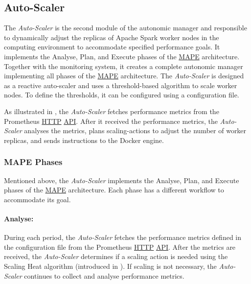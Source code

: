 \subsection{Auto-Scaler}
The \textit{Auto-Scaler} is the second module of the autonomic manager and responsible to dynamically adjust the replicas of Apache Spark worker nodes in the computing environment to accommodate specified performance goals. 
It implements the Analyse, Plan, and Execute phases of the \hyperlink{abbr:mape}{MAPE} architecture. Together with the monitoring system, it creates a complete autonomic manager implementing all phases of the \hyperlink{abbr:mape}{MAPE} architecture.
The \textit{Auto-Scaler} is designed as a reactive auto-scaler and uses a threshold-based algorithm to scale worker nodes. To define the thresholds, it can be configured using a configuration file.


As illustrated in , the \textit{Auto-Scaler} fetches performance metrics from the Prometheus \hyperlink{abbr:http}{HTTP} \hyperlink{abbr:api}{API}.
After it received the performance metrics, the \textit{Auto-Scaler} analyses the metrics, plans scaling-actions to adjust the number of worker replicas, and sends instructions to the Docker engine.


\subsubsection{MAPE Phases}
Mentioned above, the \textit{Auto-Scaler} implements the Analyse, Plan, and Execute phases of the \hyperlink{abbr:mape}{MAPE} architecture. Each phase has a different workflow to accommodate its goal.

\paragraph{Analyse:}
During each period, the \textit{Auto-Scaler} fetches the performance metrics defined in the configuration file from the Prometheus \hyperlink{abbr:http}{HTTP} \hyperlink{abbr:api}{API}.
After the metrics are received, the \textit{Auto-Scaler} determines if a scaling action is needed using the Scaling Heat algorithm (introduced in ). If scaling is not necessary, the \textit{Auto-Scaler} continues to collect and analyse performance metrics.

